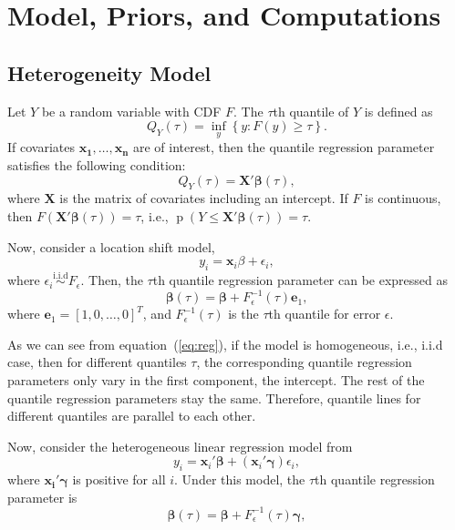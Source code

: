 \documentclass[12pt]{article}
\DeclareMathOperator{\pr}{p}
\begin{document}
\section{Model, Priors, and Computations}
\label{sec:model}
\subsection{Heterogeneity Model}
Let $Y$ be a random variable with CDF $F$.  The $\tau$th quantile of
$Y$ is defined as
\begin{displaymath}
  Q_Y(\tau) = \underset{y}{\inf} \left\{ y: F(y) \ge \tau \right\}.
\end{displaymath}
If covariates $\bm{x_1, \ldots, x_n}$ are of interest, then the
quantile regression parameter satisfies the following condition:
\begin{displaymath}
  Q_Y(\tau) = \bm{X'\beta}(\tau),
\end{displaymath}
where $\bm{X}$ is the matrix of covariates including an intercept.  If
$F$ is continuous, then $F(\bm{X'\beta}(\tau)) = \tau$, i.e., $\pr(Y
\le \bm{X'\beta}(\tau)) = \tau$.

Now, consider a location shift model,
\begin{displaymath}
  y_i = \bm{x}_i\beta + \epsilon_i,
\end{displaymath}
where $\epsilon_i \stackrel{\text{i.i.d}}{\sim} F_{\epsilon}$. Then,
the $\tau$th quantile regression parameter can be expressed as
\begin{equation} \label{eq:reg} \bm{\beta}(\tau) = \bm{\beta} +
  F^{-1}_{\epsilon}(\tau) \bm{e}_1,
\end{equation}
where $\bm{e}_1 = [1, 0, \ldots, 0]^T$, and $F^{-1}_{\epsilon}(\tau)$
is the $\tau$th quantile for error $\epsilon$.

As we can see from equation~(\ref{eq:reg}), if the model is
homogeneous, i.e., i.i.d case, then for different quantiles $\tau$,
the corresponding quantile regression parameters only vary in the
first component, the intercept. The rest of the quantile regression
parameters stay the same. Therefore, quantile lines for different
quantiles are parallel to each other.

Now, consider the heterogeneous linear regression model from
\citet{he1998}
\begin{equation}\label{eq:he}
  y_i = \bm{x}_i'\bm{\beta} + (\bm{x}_i'\bm{\gamma}) \epsilon_i,
\end{equation}
where $\bm{x_i'\gamma}$ is positive for all $i$. Under this model, the
$\tau$th quantile regression parameter is
\begin{equation}\label{eq:quan}
  \bm{\beta}(\tau) = \bm{\beta} + F^{-1}_{\epsilon}(\tau) \bm{\gamma},
\end{equation}
\end{document}
